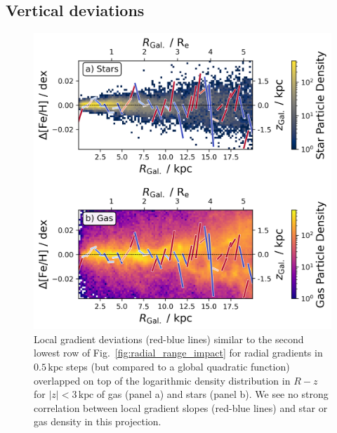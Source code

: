 \documentclass[fleqn,usenatbib]{mnras}
\begin{document}
\subsection{Vertical deviations}
\label{sec:coherence_vertical_radial_metallicity_gradients}

\begin{figure}
    \centering
    \includegraphics[width=\columnwidth]{figures/overlap_local_variation_gas.png}
    \caption{Local gradient deviations (red-blue lines) similar to the second lowest row of Fig.~\ref{fig:radial_range_impact} for radial gradients in $0.5\,\mathrm{kpc}$ steps (but compared to a global quadratic function) overlapped on top of the logarithmic density distribution in $R-z$ for $\vert z \vert < 3\,\mathrm{kpc}$ of gas (panel a) and stars (panel b). We see no strong correlation between local gradient slopes (red-blue lines) and star or gas density in this projection.}
    \label{fig:overlap_local_variation_gas}
\end{figure}
\end{document}
